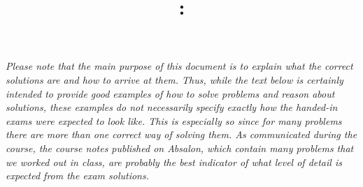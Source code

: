\documentclass{jn-pset}
\author{\courseinstructor}
\title{\coursenameshort: 
  \examheading}
\begin{document}
\maketitle

{
\noindent
\emph{%
  Please note that the main purpose of this document is to explain
  what the correct solutions are and how to arrive at them.  Thus,
  while the text below is certainly intended to provide good examples
  of how to solve problems and reason about solutions, these examples
  do not necessarily specify exactly how the handed-in exams were
  expected to look like.
%
  This is especially so since for many problems there are more than
  one correct way of solving them.  
%   
%   
  As communicated during the course, the course notes
  published on Absalon, which contain many problems that we worked out
  in class, are probably the best indicator of what level of detail is
  expected from the exam solutions.
}


}
{}
\end{document}
